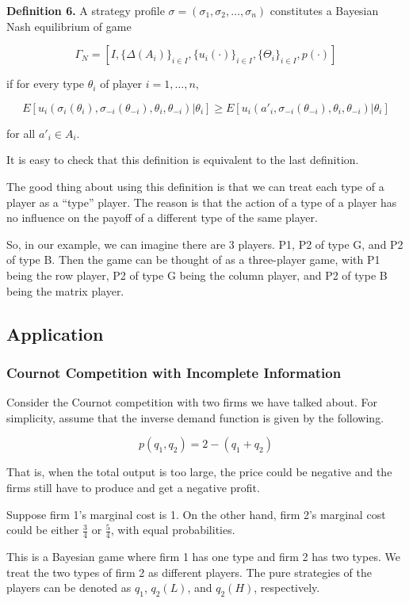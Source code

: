 \documentclass[12pt, oneside]{article}
\begin{document}
\textbf{Definition 6.} A strategy profile \( \sigma = (\sigma_1, \sigma_2, \dots, \sigma_n) \) constitutes a Bayesian Nash equilibrium of game 

\[
\Gamma_N = [I, \{\Delta(A_i)\}_{i\in I}, \{u_i(\cdot)\}_{i\in I}, \{\Theta_i\}_{i\in I}, p(\cdot)]
\]

if for every type \( \theta_i \) of player \( i = 1, \dots, n \),

\[
E[u_i(\sigma_i(\theta_i), \sigma_{-i}(\theta_{-i}), \theta_i, \theta_{-i}) | \theta_i] \geq E[u_i(a'_i, \sigma_{-i}(\theta_{-i}), \theta_i, \theta_{-i}) | \theta_i]
\]

for all \( a'_i \in A_i \).

It is easy to check that this definition is equivalent to the last definition.

The good thing about using this definition is that we can treat each type of a player as a “type” player. The reason is that the action of a type of a player has no influence on the payoff of a different type of the same player.

So, in our example, we can imagine there are 3 players. P1, P2 of type G, and P2 of type B. Then the game can be thought of as a three-player game, with P1 being the row player, P2 of type G being the column player, and P2 of type B being the matrix player.

\subsection{Application}
\subsubsection{Cournot Competition with Incomplete Information}
Consider the Cournot competition with two firms we have talked about. For simplicity, assume that the inverse demand function is given by the following.

\[
p(q_1, q_2) = 2 - (q_1 + q_2)
\]

That is, when the total output is too large, the price could be negative and the firms still have to produce and get a negative profit.

Suppose firm 1’s marginal cost is 1. On the other hand, firm 2’s marginal cost could be either \( \frac{3}{4} \) or \( \frac{5}{4} \), with equal probabilities.

This is a Bayesian game where firm 1 has one type and firm 2 has two types. We treat the two types of firm 2 as different players. The pure strategies of the players can be denoted as \( q_1 \), \( q_2(L) \), and \( q_2(H) \), respectively.
\end{document}
